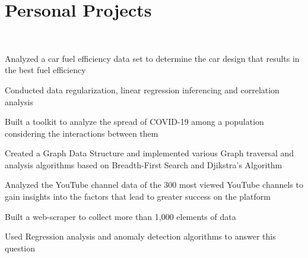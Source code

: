 \documentclass[]{deedy-resume-openfont}
\begin{document}
\begin{minipage}[t]{0.66\textwidth}
\section{Personal Projects}\\
\vspace{3mm} %
\begin{tightemize}
\item Analyzed a car fuel efficiency data set to determine the car design that results in the best fuel efficiency
\item Conducted data regularization, linear regression inferencing and correlation analysis
\end{tightemize}
\sectionsep
{}
\vspace{0.5mm} %
\vspace{1mm} %
\begin{tightemize}
\item Built a toolkit to analyze the spread of COVID-19 among a population considering the interactions between them
\item Created a Graph Data Structure and implemented various Graph traversal and analysis algorithms  based on Breadth-First Search and Djikstra's Algorithm
\end{tightemize}
\sectionsep
\vspace{0.5mm} %
\vspace{0.5mm} %
\begin{tightemize}
\item Analyzed the YouTube channel data of the 300 most viewed YouTube channels to gain insights into the factors that lead to greater success on the platform
\item Built a web-scraper to collect more than 1,000 elements of data
\item Used Regression analysis and anomaly detection algorithms to answer this question
\end{tightemize}
\sectionsep


\end{minipage} 
\end{document}
